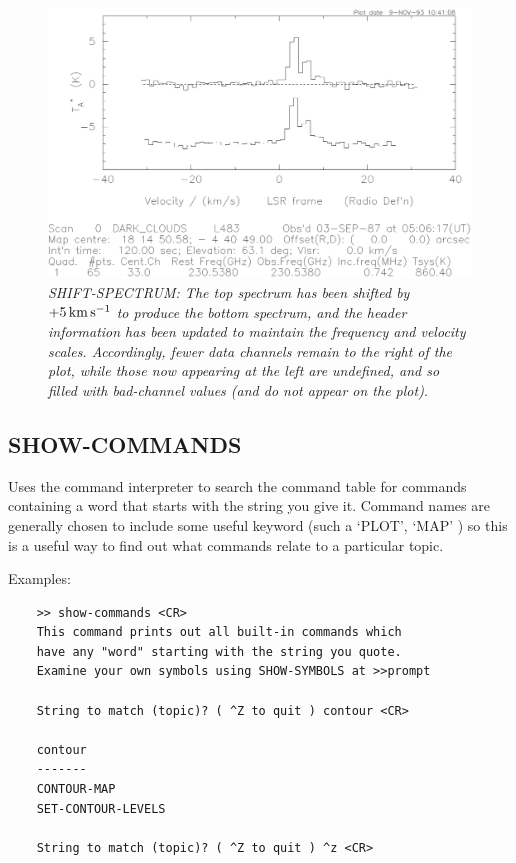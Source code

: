 \documentclass[11pt,twoside]{report}
\begin{document}
\begin{figure}[htbp]
\begin{center}
\includegraphics[scale=0.65]{shift.ps}
\protect\parbox{5.5in}
{\caption[SHIFT]
{\sl
SHIFT-SPECTRUM: The top spectrum has been shifted by $+5{\rm\,km\,s^{-1}}$ to produce
the bottom spectrum, and the header information has been updated to maintain
the frequency and velocity scales. Accordingly, fewer data channels remain to
the right of the plot, while those now appearing at the left are undefined, and
so filled with bad-channel values (and do not appear on the plot). 
\label{SHIFT}
}
}
\end{center}
\end{figure}

\subsection{SHOW-COMMANDS} 

Uses the command interpreter to search the command table 
for commands containing a word that starts with the string you give it. Command
names are generally chosen to include some useful keyword  (such
a `PLOT', `MAP' \etc) so this is a useful way to find out what commands relate
to a particular topic. 

Examples:
\begin{verbatim}
    >> show-commands <CR>
    This command prints out all built-in commands which
    have any "word" starting with the string you quote.
    Examine your own symbols using SHOW-SYMBOLS at >>prompt

    String to match (topic)? ( ^Z to quit ) contour <CR>

    contour
    -------
    CONTOUR-MAP
    SET-CONTOUR-LEVELS      

    String to match (topic)? ( ^Z to quit ) ^z <CR>
\end{verbatim}
\end{document}
